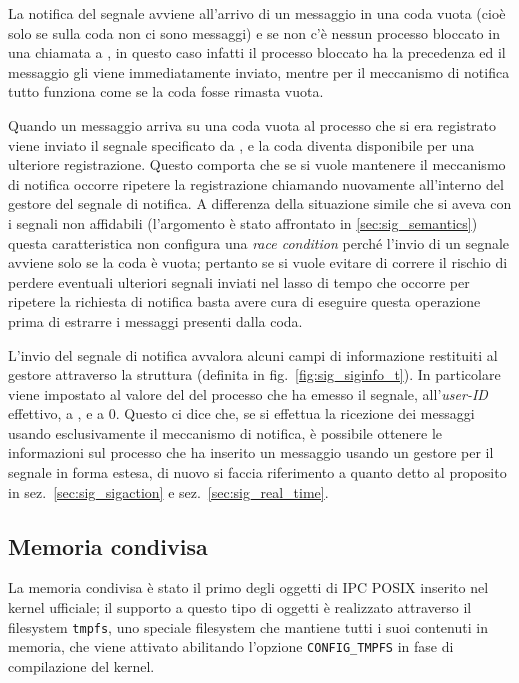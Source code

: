 La notifica del segnale avviene all'arrivo di un messaggio in una coda vuota
(cioè solo se sulla coda non ci sono messaggi) e se non c'è nessun processo
bloccato in una chiamata a , in questo caso infatti il
processo bloccato ha la precedenza ed il messaggio gli viene immediatamente
inviato, mentre per il meccanismo di notifica tutto funziona come se la coda
fosse rimasta vuota.

Quando un messaggio arriva su una coda vuota al processo che si era registrato
viene inviato il segnale specificato da , e
la coda diventa disponibile per una ulteriore registrazione.  Questo comporta
che se si vuole mantenere il meccanismo di notifica occorre ripetere la
registrazione chiamando nuovamente  all'interno del gestore
del segnale di notifica. A differenza della situazione simile che si aveva con
i segnali non affidabili (l'argomento è stato affrontato in
\ref{sec:sig_semantics}) questa caratteristica non configura una \textit{race
  condition} perché l'invio di un segnale avviene solo se la coda è vuota;
pertanto se si vuole evitare di correre il rischio di perdere eventuali
ulteriori segnali inviati nel lasso di tempo che occorre per ripetere la
richiesta di notifica basta avere cura di eseguire questa operazione prima di
estrarre i messaggi presenti dalla coda.

L'invio del segnale di notifica avvalora alcuni campi di informazione
restituiti al gestore attraverso la struttura  (definita in
fig.~\ref{fig:sig_siginfo_t}). In particolare  viene impostato al
valore del  del processo che ha emesso il segnale, 
all'\textsl{user-ID} effettivo,  a , e
 a 0. Questo ci dice che, se si effettua la ricezione dei
messaggi usando esclusivamente il meccanismo di notifica, è possibile ottenere
le informazioni sul processo che ha inserito un messaggio usando un gestore
per il segnale in forma estesa, di nuovo si faccia riferimento a quanto detto
al proposito in sez.~\ref{sec:sig_sigaction} e sez.~\ref{sec:sig_real_time}.


\subsection{Memoria condivisa}
\label{sec:ipc_posix_shm}

La memoria condivisa è stato il primo degli oggetti di IPC POSIX inserito nel
kernel ufficiale; il supporto a questo tipo di oggetti è realizzato attraverso
il filesystem \texttt{tmpfs}, uno speciale filesystem che mantiene tutti i
suoi contenuti in memoria, che viene attivato abilitando l'opzione
\texttt{CONFIG\_TMPFS} in fase di compilazione del kernel.

